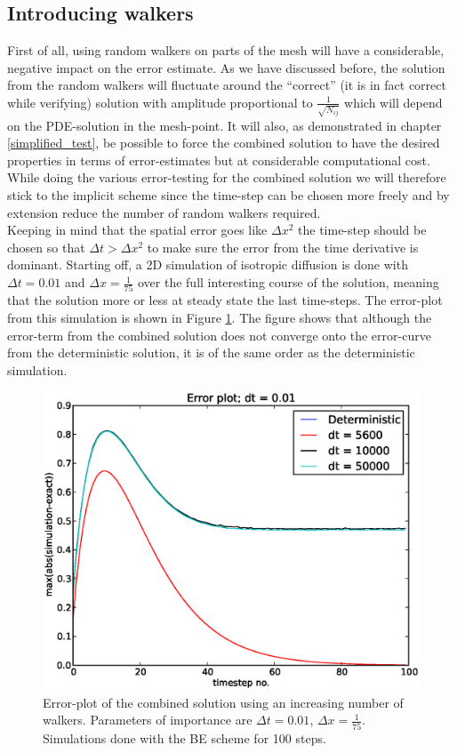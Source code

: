 \subsection{Introducing walkers}

First of all, using random walkers on parts of the mesh will have a considerable, negative impact on the error estimate. 
As we have discussed before, the solution from the random walkers will fluctuate around the ``correct'' (it is in fact correct while verifying) solution with amplitude proportional to $\frac{1}{\sqrt{N_{ij}}}$ which will depend on the PDE-solution in the mesh-point. 
It will also, as demonstrated in chapter \ref{simplified_test}, be possible to force the combined solution to have the desired properties in terms of error-estimates but at considerable computational cost. 
While doing the various error-testing for the combined solution we will therefore stick to the implicit scheme since the time-step can be chosen more freely and by extension reduce the number of random walkers required.\\
Keeping in mind that the spatial error goes like $\Delta x^2$ the time-step should be chosen so that $\Delta t> \Delta x^2$ to make sure the error from the time derivative is dominant. 
Starting off, a 2D simulation of isotropic diffusion is done with $\Delta t = 0.01$ and $\Delta x = \frac{1}{75}$ over the full interesting course of the solution, meaning that the solution more or less at steady state the last time-steps. 
The error-plot from this simulation is shown in Figure \ref{errorplot_combined_BE2d}. The figure shows that although the error-term from the combined solution does not converge onto the error-curve from the deterministic solution, it is of the same order as the deterministic simulation. 
\begin{figure}[H]
 \centering
 \includegraphics[scale=0.7]{../doc/results/experiment_17022014_1541/results/errorplot.eps}
 \caption{Error-plot of the combined solution using an increasing number of walkers. Parameters of importance are $\Delta t = 0.01$, $\Delta x = \frac{1}{75}$. Simulations done with the BE scheme for 100 steps.}
 \label{errorplot_combined_BE2d}
\end{figure}

